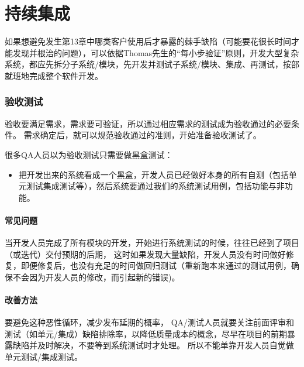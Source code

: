 \chapter{持续集成} %

如果想避免发生第13章中哪类客户使用后才暴露的棘手缺陷（可能要花很长时间才能发现并根治的问题），可以依据Thomas先生的“每小步验证”原则，开发大型复杂系统，都应先拆分子系统/模块，先开发并测试子系统/模块、集成、再测试，按部就班地完成整个软件开发。

\hypertarget{ux9a8cux6536ux6d4bux8bd5}{%
\subsection{验收测试}\label{ux9a8cux6536ux6d4bux8bd5}}

验收要满足需求，需求要可验证，所以通过相应需求的测试成为验收通过的必要条件。
需求确定后，就可以规范验收通过的准则，开始准备验收测试了。

很多QA人员以为验收测试只需要做黑盒测试：

\begin{itemize}
\tightlist
\item
  把开发出来的系统看成一个黑盒，开发人员已经做好本身的所有自测（包括单元测试集成测试等），然后系统要通过我们的系统测试用例，包括功能与非功能。
\end{itemize}

\hypertarget{ux5e38ux89c1ux95eeux9898}{%
\subsubsection{常见问题}\label{ux5e38ux89c1ux95eeux9898}}

当开发人员完成了所有模块的开发，开始进行系统测试的时候，往往已经到了项目（或迭代）交付预期的后期，
这时如果发现大量缺陷，开发人员没有时间做好修复，即便修复后，也没有充足的时间做回归测试（重新跑本来通过的测试用例，确保不会因为开发人员的修改，而引起新的错误)。

\hypertarget{ux6539ux5584ux65b9ux6cd5}{%
\subsubsection{改善方法}\label{ux6539ux5584ux65b9ux6cd5}}

要避免这种恶性循环，减少发布延期的概率，
QA/测试人员就要关注前面评审和测试（如单元/集成）缺陷排除率，以降低质量成本的概念，尽早在项目的前期暴露缺陷并及时解决，不要等到系统测试时才处理。
所以不能单靠开发人员自觉做单元测试/集成测试。

